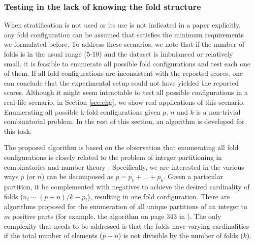 \documentclass[5p, final]{elsarticle}
\begin{document}

\subsubsection{Testing in the lack of knowing the fold structure}
\label{sec:kfold}

When stratification is not used or its use is not indicated in a paper explicitly, any fold configuration can be assumed that satisfies the minimum requirements we formulated before. To address these scenarios, we note that if the number of folds is in the usual range (5-10) and the dataset is imbalanced or relatively small, it is feasible to enumerate all possible fold configurations and test each one of them. If all fold configurations are inconsistent with the reported scores, one can conclude that the experimental setup could not have yielded the reported scores. Although it might seem intractable to test all possible configurations in a real-life scenario, in Section \ref{sec:ehg}, we show real applications of this scenario. Enumerating all possible k-fold configurations given $p$, $n$ and $k$ is a non-trivial combinatorial problem. In the rest of this section, an algorithm is developed for this task.

The proposed algorithm is based on the observation that enumerating all fold configurations is closely related to the problem of integer partitioning in combinatorics and number theory \cite{intpart}. Specifically, we are interested in the various ways $p$ (or $n$) can be decomposed as $p = p_1 + \dots + p_k$. Given a particular partition, it be complemented with negatives to achieve the desired cardinality of folds ($n_i \sim (p + n)/k - p_i$), resulting in one fold configuration. There are algorithms proposed for the enumeration of all unique partitions of an integer to $m$ positive parts (for example, the algorithm on page 343 in \cite{intpart}). The only complexity that needs to be addressed is that the folds have varying cardinalities if the total number of elements ($p + n$) is not divisible by the number of folds ($k$).
\end{document}
